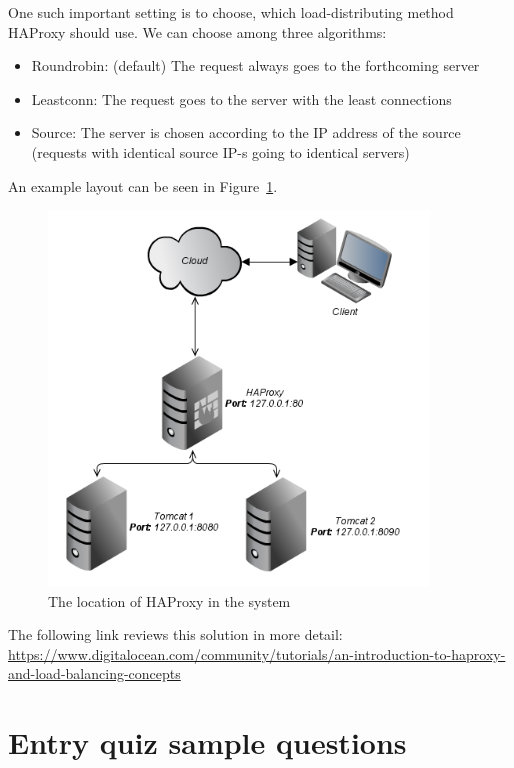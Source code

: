 \documentclass[a4paper]{article}
\begin{document}
One such important setting is to choose, which load-distributing method HAProxy should use. We can choose among three
algorithms:
\begin{itemize}
    \item Roundrobin: (default) The request always goes to the forthcoming server
    \item Leastconn: The request goes to the server with the least connections
    \item Source: The server is chosen according to the IP address of the source (requests with identical source IP-s going
          to identical servers)
\end{itemize}
An example layout can be seen in Figure~\ref{fig:haproxy}.

\begin{figure}[H]
    \centering
    \includegraphics[width=0.9\textwidth]{figures/haproxy.png}
    \caption{The location of HAProxy in the system}
    \label{fig:haproxy}
\end{figure}

The following link reviews this solution in more detail:
\url{https://www.digitalocean.com/community/tutorials/an-introduction-to-haproxy-and-load-balancing-concepts}

\appendix

\section{Entry quiz sample questions}
\end{document}
